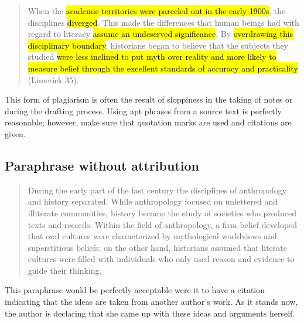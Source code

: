\begin{Spacing}{1.5}
\begin{quote}
When the \hl{academic territories were parceled out in the early 1900s}, the disciplines \hl{diverged}. This made the differences that human beings had with regard to literacy \hl{assume an undeserved significance}. By \hl{overdrawing this disciplinary boundary}, historians began to believe that the subjects they studied \hl{were less inclined to put myth over reality and more likely to measure belief through the excellent standards of accuracy and practicality} (Limerick 35). 
\end{quote}
\end{Spacing}

 This form of plagiarism is often the result of sloppiness in the taking of notes or during the drafting process. Using apt phrases from a source text is perfectly reasonable; however, make sure that quotation marks are used and citations are given.

\subsection{Paraphrase without attribution}
\begin{Spacing}{1.5}
\begin{quote}
During the early part of the last century the disciplines of anthropology and history separated. While anthropology focused on unlettered and illiterate communities, history became the study of societies who produced texts and records. Within the field of anthropology, a firm belief developed that oral cultures were characterized by mythological worldviews and superstitious beliefs; on the other hand, historians assumed that literate cultures were filled with individuals who only used reason and evidence to guide their thinking.
\end{quote}
\end{Spacing}

 This paraphrase would be perfectly acceptable were it to have a citation indicating that the ideas are taken from another author's work. As it stands now, the author is declaring that she came up with these ideas and arguments herself.




